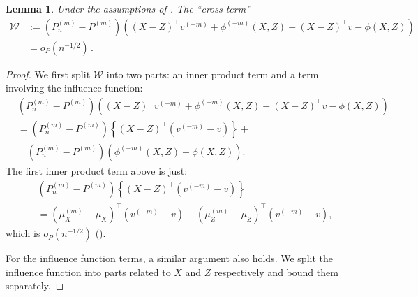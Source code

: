 \documentclass[11pt]{article}
\newtheorem{lemma}[theorem]{Lemma}
\begin{document}
\begin{lemma}
\label{lemma: cross term}
Under the assumptions of . The ``cross-term'' 
\begin{equation*}
\begin{aligned}
  \mathcal{W}&:=\left(P_n^{(m)}-P^{(m)}\right)\left((X-Z)^{\top} v^{(-m)}+\phi^{(-m)}(X, Z)-(X-Z)^{\top} v-\phi(X, Z)\right)\\
& =o_P(n^{-1/2})\,.  
\end{aligned}
\end{equation*}
\end{lemma}
\begin{proof}
We first split $\mathcal{W}$ into two parts: an inner product term and a term involving the influence function:
    \begin{equation*}
    \begin{aligned}
     & \left(P_n^{(m)}-P^{(m)}\right)\left((X-Z)^{\top} v^{(-m)}+\phi^{(-m)}(X, Z)-(X-Z)^{\top} v-\phi(X, Z)\right) \\
     & = \left(P_n^{(m)}-P^{(m)}\right)\left\{(X-Z)^{\top}\left(v^{(-m)}-v\right)\right\} + \\
     & \quad \left(P_n^{(m)}-P^{(m)}\right)\left(\phi^{(-m)}(X, Z)-\phi(X, Z)\right).
    \end{aligned}
\end{equation*}
The first inner product term above is just:
\begin{equation*}
    \begin{aligned}
        &\left(P_n^{(m)}-P^{(m)}\right)\left\{(X-Z)^{\top}\left(v^{(-m)}-v\right)\right\}\\
        & = \left(\mu_X^{(m)}-\mu_X\right)^{\top}\left(v^{(-m)}-v\right) - \left(\mu_Z^{(m)}-\mu_Z\right)^{\top}\left(v^{(-m)}-v\right),
    \end{aligned}
\end{equation*}
which is $o_P(n^{-1/2})$ ().


For the influence function terms, a similar argument also holds. We split the influence function into parts related to $X$ and $Z$ respectively and bound them separately. 


\end{proof}
\end{document}
